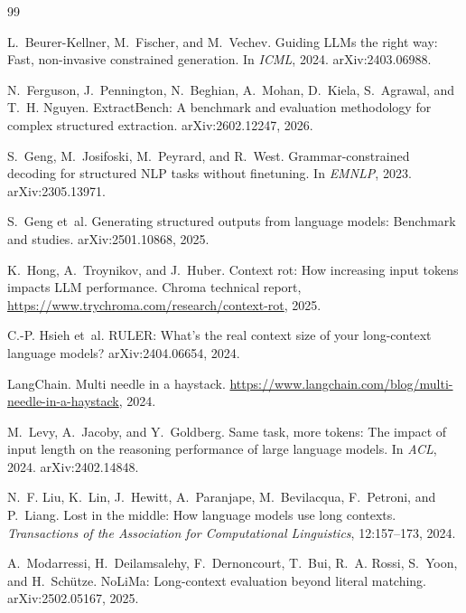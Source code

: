 \documentclass[11pt]{article}
\begin{document}
\begin{thebibliography}{99}

L.~Beurer-Kellner, M.~Fischer, and M.~Vechev.
\newblock Guiding LLMs the right way: Fast, non-invasive constrained generation.
\newblock In \emph{ICML}, 2024. arXiv:2403.06988.

N.~Ferguson, J.~Pennington, N.~Beghian, A.~Mohan, D.~Kiela, S.~Agrawal, and
  T.~H. Nguyen.
\newblock ExtractBench: A benchmark and evaluation methodology for complex
  structured extraction.
\newblock arXiv:2602.12247, 2026.

S.~Geng, M.~Josifoski, M.~Peyrard, and R.~West.
\newblock Grammar-constrained decoding for structured NLP tasks without
  finetuning.
\newblock In \emph{EMNLP}, 2023. arXiv:2305.13971.

S.~Geng et~al.
\newblock Generating structured outputs from language models: Benchmark and
  studies.
\newblock arXiv:2501.10868, 2025.

K.~Hong, A.~Troynikov, and J.~Huber.
\newblock Context rot: How increasing input tokens impacts LLM performance.
\newblock Chroma technical report,
  \url{https://www.trychroma.com/research/context-rot}, 2025.

C.-P. Hsieh et~al.
\newblock RULER: What's the real context size of your long-context language
  models?
\newblock arXiv:2404.06654, 2024.

LangChain.
\newblock Multi needle in a haystack.
\newblock \url{https://www.langchain.com/blog/multi-needle-in-a-haystack}, 2024.

M.~Levy, A.~Jacoby, and Y.~Goldberg.
\newblock Same task, more tokens: The impact of input length on the reasoning
  performance of large language models.
\newblock In \emph{ACL}, 2024. arXiv:2402.14848.

N.~F. Liu, K.~Lin, J.~Hewitt, A.~Paranjape, M.~Bevilacqua, F.~Petroni, and
  P.~Liang.
\newblock Lost in the middle: How language models use long contexts.
\newblock \emph{Transactions of the Association for Computational Linguistics},
  12:157--173, 2024.

A.~Modarressi, H.~Deilamsalehy, F.~Dernoncourt, T.~Bui, R.~A. Rossi, S.~Yoon,
  and H.~Sch\"utze.
\newblock NoLiMa: Long-context evaluation beyond literal matching.
\newblock arXiv:2502.05167, 2025.


\end{thebibliography}
\end{document}
